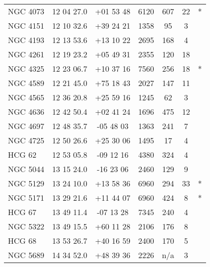 \begin{table*}
\begin{center}
\begin{tabular}{@{}lcccccr@{}}
NGC 4073  &  12 04 27.0  &  +01 53 48  &  6120      &  607        &  22       &  *\citet{ledlow96}     \\
NGC 4151  &  12 10 32.6  &  +39 24 21  &  1358      &  95         &  3        &  \citet{ramella97}     \\
NGC 4193  &  12 13 53.6  &  +13 10 22  &  2695      &  168        &  4        &  \citet{nolthenius93}  \\
NGC 4261  &  12 19 23.2  &  +05 49 31  &  2355      &  120        &  18       &  \citet{garcia93}      \\
NGC 4325  &  12 23 06.7  &  +10 37 16  &  7560      &  256        &  18       &  *\citet{mulchaey98}   \\
NGC 4589  &  12 21 45.0  &  +75 18 43  &  2027      &  147        &  11       &  \citet{garcia93}      \\
NGC 4565  &  12 36 20.8  &  +25 59 16  &  1245      &  62         &  3        &  \citet{giudice99}     \\
NGC 4636  &  12 42 50.4  &  +02 41 24  &  1696      &  475        &  12       &  \citet{nolthenius93}  \\
NGC 4697  &  12 48 35.7  &  -05 48 03  &  1363      &  241        &  7        &  \citet{giudice99}     \\
NGC 4725  &  12 50 26.6  &  +25 30 06  &  1495      &  17         &  4        &  \citet{ramella97}     \\
HCG 62    &  12 53 05.8  &  -09 12 16  &  4380      &  324        &  4        &  \citet{hickson82}     \\
NGC 5044  &  13 15 24.0  &  -16 23 06  &  2460      &  129        &  9        &  \citet{garcia93}      \\
NGC 5129  &  13 24 10.0  &  +13 58 36  &  6960      &  294        &  33       &  *\citet{mulchaey98}   \\
NGC 5171  &  13 29 21.6  &  +11 44 07  &  6960      &  424        &  8        &  *\citet{ledlow96}     \\
HCG 67    &  13 49 11.4  &  -07 13 28  &  7345      &  240        &  4        &  \citet{hickson82}     \\
NGC 5322  &  13 49 15.5  &  +60 11 28  &  2106      &  176        &  8        &  \citet{garcia93}      \\
HCG 68    &  13 53 26.7  &  +40 16 59  &  2400      &  170        &  5        &  \citet{hickson82}     \\
NGC 5689  &  14 34 52.0  &  +48 39 36  &  2226      &  n/a        &  3        &  \citet{white99}       \\

\end{tabular}
\end{center}
\end{table*}
